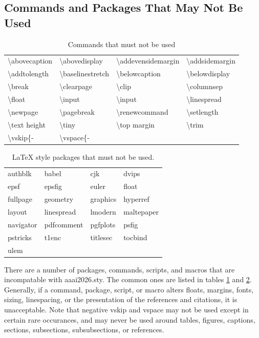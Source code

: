 \subsection{Commands and Packages That May Not Be Used}
\begin{table}[t]
\centering

\begin{tabular}{l|l|l|l}
\textbackslash abovecaption &
\textbackslash abovedisplay &
\textbackslash addevensidemargin &
\textbackslash addsidemargin \\
\textbackslash addtolength &
\textbackslash baselinestretch &
\textbackslash belowcaption &
\textbackslash belowdisplay \\
\textbackslash break &
\textbackslash clearpage &
\textbackslash clip &
\textbackslash columnsep \\
\textbackslash float &
\textbackslash input &
\textbackslash input &
\textbackslash linespread \\
\textbackslash newpage &
\textbackslash pagebreak &
\textbackslash renewcommand &
\textbackslash setlength \\
\textbackslash text height &
\textbackslash tiny &
\textbackslash top margin &
\textbackslash trim \\
\textbackslash vskip\{- &
\textbackslash vspace\{- \\
\end{tabular}
\caption{Commands that must not be used}
\label{table1}
\end{table}

\begin{table}[t]
\centering
\begin{tabular}{l|l|l|l}
    authblk & babel & cjk & dvips \\
    epsf & epsfig & euler & float \\
    fullpage & geometry & graphics & hyperref \\
    layout & linespread & lmodern & maltepaper \\
    navigator & pdfcomment & pgfplots & psfig \\
    pstricks & t1enc & titlesec & tocbind \\
    ulem
\end{tabular}
\caption{LaTeX style packages that must not be used.}
\label{table2}
\end{table}

There are a number of packages, commands, scripts, and macros that are
incompatable with aaai2026.sty. The common ones are listed in tables
\ref{table1} and \ref{table2}. Generally, if a command, package, script,
or macro alters floats, margins, fonts, sizing, linespacing, or the
presentation of the references and citations, it is unacceptable. Note
that negative vskip and vspace may not be used except in certain rare
occurances, and may never be used around tables, figures, captions,
sections, subsections, subsubsections, or references.

